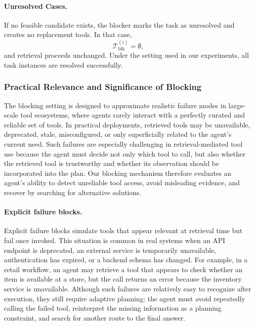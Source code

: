 \documentclass{llmxive}
\begin{document}
\paragraph{Unresolved Cases.}
If no feasible candidate exists, the blocker marks the task as unresolved and creates no replacement tools.
In that case,
\begin{equation}
\mathcal{T}^{(i)}_{\mathrm{blk}}=\emptyset,
\end{equation}
and retrieval proceeds unchanged.
Under the setting used in our experiments, all task instances are resolved successfully.




\subsubsection{Practical Relevance and Significance of Blocking}
\label{app:blocker-significance}

The blocking setting is designed to approximate realistic failure modes in large-scale tool ecosystems, where agents rarely interact with a perfectly curated and reliable set of tools. In practical deployments, retrieved tools may be unavailable, deprecated, stale, misconfigured, or only superficially related to the agent's current need. Such failures are especially challenging in retrieval-mediated tool use because the agent must decide not only which tool to call, but also whether the retrieved tool is trustworthy and whether its observation should be incorporated into the plan. Our blocking mechanism therefore evaluates an agent's ability to detect unreliable tool access, avoid misleading evidence, and recover by searching for alternative solutions.

\paragraph{Explicit failure blocks.}
Explicit failure blocks simulate tools that appear relevant at retrieval time but fail once invoked.
This situation is common in real systems when an API endpoint is deprecated, an external service is temporarily unavailable, authentication has expired, or a backend schema has changed. 
For example, in a retail workflow, an agent may retrieve a tool that appears to check whether an item is available at a store, but the call returns an error because the inventory service is unavailable. 
Although such failures are relatively easy to recognize after execution, they still require adaptive planning: the agent must avoid repeatedly calling the failed tool, reinterpret the missing information as a planning constraint, and search for another route to the final answer.
\end{document}
